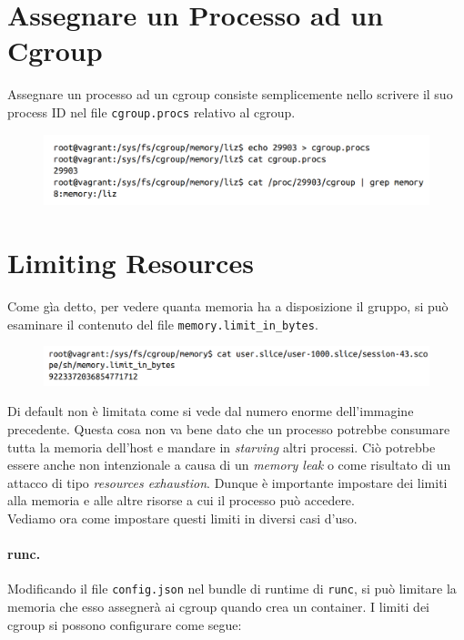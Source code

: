 \section{Assegnare un Processo ad un Cgroup}

Assegnare un processo ad un cgroup consiste semplicemente nello scrivere il suo
process ID nel file \verb|cgroup.procs| relativo al cgroup.

\begin{figure}[H]
    \centering
    \includegraphics[width=\textwidth, keepaspectratio]{capitoli/os_security/imgs/limit4.png}
\end{figure}

\section{Limiting Resources}

Come gìa detto, per vedere quanta memoria ha a disposizione il gruppo, si può
esaminare il contenuto del file \verb|memory.limit_in_bytes|.

\begin{figure}[H]
    \centering
    \includegraphics[width=\textwidth, keepaspectratio]{capitoli/os_security/imgs/limit1.png}
\end{figure}

Di default non è limitata come si vede dal numero enorme dell'immagine precedente.
Questa cosa non va bene dato che un processo potrebbe consumare tutta la memoria
dell'host e mandare in \textit{starving} altri processi. Ciò potrebbe essere
anche non intenzionale a causa di un \textit{memory leak} o come risultato di
un attacco di tipo \textit{resources exhaustion}. Dunque è importante impostare
dei limiti alla memoria e alle altre risorse a cui il processo può accedere.\\

Vediamo ora come impostare questi limiti in diversi casi d'uso.

\paragraph{runc.}
Modificando il file \verb|config.json| nel bundle di runtime di \verb|runc|, si può
limitare la memoria che esso assegnerà ai cgroup quando crea un container.
I limiti dei cgroup si possono configurare come segue:


